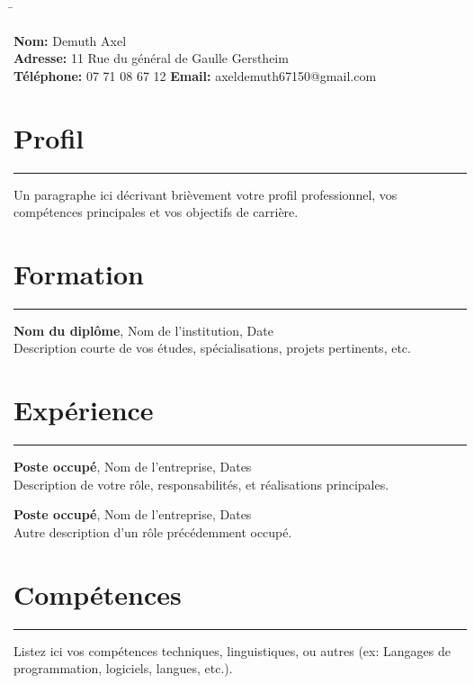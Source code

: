 \documentclass[a4paper,10pt]{article}
\newcommand{\personalinfo}[1]{
    \noindent
    \begin{tabbing}
    \hspace{2cm} \= \kill
    #1
    \end{tabbing}
}
\newcommand{\sectionline}{
    \noindent\rule{\textwidth}{0.5pt}
}
\begin{document}
\personalinfo{
    \textbf{Nom:} Demuth Axel \\
    \textbf{Adresse:} 11 Rue du général de Gaulle Gerstheim  \\
    \textbf{Téléphone:} 07 71 08 67 12
    \textbf{Email:} axeldemuth67150@gmail.com
}

\section*{Profil}
\sectionline
Un paragraphe ici décrivant brièvement votre profil professionnel, vos compétences principales et vos objectifs de carrière.

\section*{Formation}
\sectionline
\textbf{Nom du diplôme}, Nom de l'institution, Date \\
Description courte de vos études, spécialisations, projets pertinents, etc.

\section*{Expérience}
\sectionline
\textbf{Poste occupé}, Nom de l'entreprise, Dates \\
Description de votre rôle, responsabilités, et réalisations principales.

\noindent
\textbf{Poste occupé}, Nom de l'entreprise, Dates \\
Autre description d'un rôle précédemment occupé.

\section*{Compétences}
\sectionline
Listez ici vos compétences techniques, linguistiques, ou autres (ex: Langages de programmation, logiciels, langues, etc.).
\end{document}
